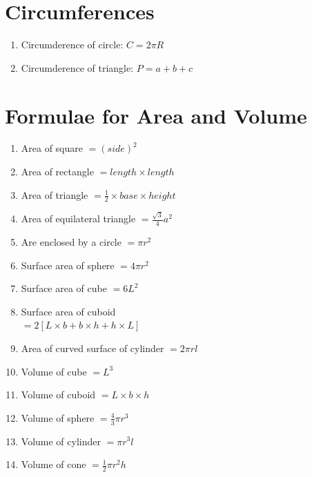 \documentclass{article}
\begin{document}
\endgroup


\section{Circumferences}

\begin{multicols}{2}
\begin{enumerate}
    \item Circumderence of circle: $C = 2\pi R$
    \item Circumderence of triangle: $P = a + b + c$
\end{enumerate}

\end{multicols}


\section{Formulae for Area and Volume}

\begin{multicols}{2}

\begin{enumerate}
    \item Area of square $=(side)^2$
    \item Area of rectangle $=length \times length$
    \item Area of triangle $=\frac{1}{2}\times base\times height$ 
    \item Area of equilateral triangle $=\frac{\sqrt{3}}{4}a^2$
    \item Are enclosed by a circle $=\pi r^2$
    \item Surface area of sphere $=4\pi r^2$
    \item Surface area of cube $=6L^2$
    \item Surface area of cuboid \\ $=2[L\times b + b\times h + h\times L]$
    \item Area of curved surface of cylinder $=2\pi rl$
    \item Volume of cube $=L^3$
    \item Volume of cuboid $=L\times b\times h$
    \item Volume of sphere $=\frac{4}{3}\pi r^3$
    \item Volume of cylinder $=\pi r^3 l$
    \item Volume of cone $=\frac{1}{2}\pi r^2 h$
\end{enumerate}

\end{multicols}
\end{document}
